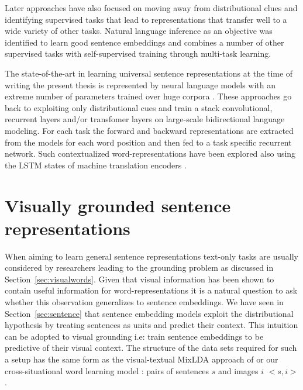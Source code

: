 Later approaches have also focused on moving away from distributional clues
and identifying supervised tasks that lead to representations that transfer
well to a wide variety of other tasks. Natural language inference as an objective
was identified to learn good sentence embeddings \citep{conneau-EtAl:2017:EMNLP2017}
and \cite{subramanian2018learning} combines a number of other supervised tasks
with self-supervised training through multi-task learning.

The state-of-the-art in learning universal sentence representations %
at the time of writing the present thesis is
represented by neural language models with an extreme number of parameters
trained over huge corpora \citep{peters2018deep,devlin2018bert}.
These approaches go back to
exploiting only distributional cues and train a stack convolutional, recurrent layers
and/or transfomer layers on large-scale bidirectional language modeling.
For each task the forward and backward representations are extracted from the models
for each word position and then fed to a task specific recurrent network.
Such contextualized word-representations have been explored also using
the LSTM states of machine translation encoders \citep{mccann2017learned}.

\section{Visually grounded sentence representations}
\label{sec:visualsentences}

When aiming to learn general sentence representations text-only tasks
are usually considered by researchers leading to the grounding problem
as discussed in Section~\ref{sec:visualwords}. Given that visual information
has been shown to contain useful information for word-representations it
is a natural question to ask whether this observation generalizes to sentence
embeddings. We have seen in Section~\ref{sec:sentence} that sentence embedding
models exploit the distributional hypothesis by treating sentences as units and
predict their context. This intuition can be adopted to visual grounding i.e:
train sentence embeddings to be predictive of their visual context. The
structure of the data sets required for such a setup has the same form
as the visual-textual MixLDA approach of \cite{feng2010visual} or our
cross-situational word learning model \citep{kadar2015learning}:
pairs of sentences $s$ and images $i$ $<s, i>$.

